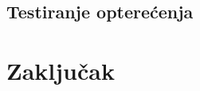\documentclass[12pt,oneside]{memoir}
\begin{document}
\section{Testiranje opterećenja}

\chapter{Zaključak}

\literatura

\backmatter


\end{document}
